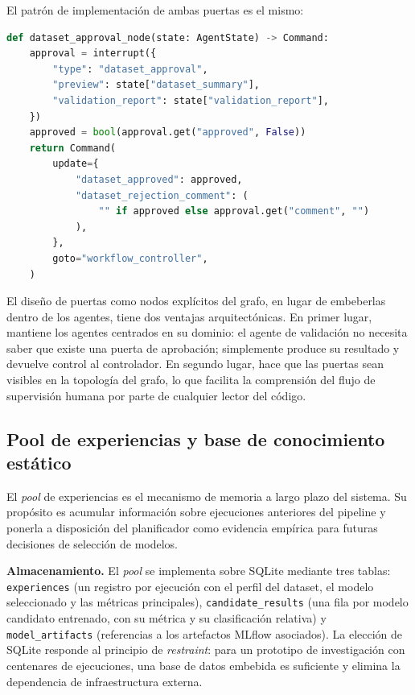 El patrón de implementación de ambas puertas es el mismo:

\begin{lstlisting}[language=Python, caption={Patrón de nodo HITL para la aprobación del dataset.}, label={lst:hitl-gate}]
def dataset_approval_node(state: AgentState) -> Command:
    approval = interrupt({
        "type": "dataset_approval",
        "preview": state["dataset_summary"],
        "validation_report": state["validation_report"],
    })
    approved = bool(approval.get("approved", False))
    return Command(
        update={
            "dataset_approved": approved,
            "dataset_rejection_comment": (
                "" if approved else approval.get("comment", "")
            ),
        },
        goto="workflow_controller",
    )
\end{lstlisting}

El diseño de puertas como nodos explícitos del grafo, en lugar de embeberlas dentro de los agentes, tiene dos ventajas arquitectónicas. En primer lugar, mantiene los agentes centrados en su dominio: el agente de validación no necesita saber que existe una puerta de aprobación; simplemente produce su resultado y devuelve control al controlador. En segundo lugar, hace que las puertas sean visibles en la topología del grafo, lo que facilita la comprensión del flujo de supervisión humana por parte de cualquier lector del código.


\subsection{Pool de experiencias y base de conocimiento estático}
\label{sec:experience-pool}

El \emph{pool} de experiencias es el mecanismo de memoria a largo plazo del sistema. Su propósito es acumular información sobre ejecuciones anteriores del pipeline y ponerla a disposición del planificador como evidencia empírica para futuras decisiones de selección de modelos.

\textbf{Almacenamiento.} El \emph{pool} se implementa sobre SQLite mediante tres tablas: \texttt{experiences} (un registro por ejecución con el perfil del dataset, el modelo seleccionado y las métricas principales), \texttt{candidate\_results} (una fila por modelo candidato entrenado, con su métrica y su clasificación relativa) y \texttt{model\_artifacts} (referencias a los artefactos MLflow asociados). La elección de SQLite responde al principio de \emph{restraint}: para un prototipo de investigación con centenares de ejecuciones, una base de datos embebida es suficiente y elimina la dependencia de infraestructura externa.

